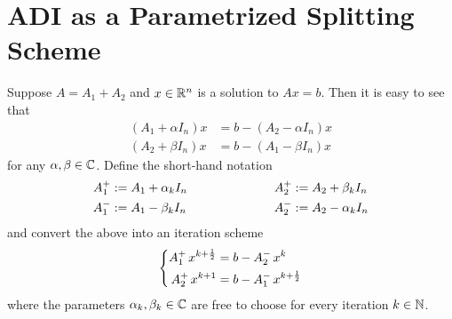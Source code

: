 
\section{ADI as a Parametrized Splitting Scheme}
\label{sec:adi:1step}

Suppose $A=A_1+A_2$ and $x\in\mathbb{R}^n$ is a solution to $Ax=b$.
Then it is easy to see that
\begin{align*}
  (A_1 + \alpha I_n)x &= b - (A_2 - \alpha I_n) x \\
  (A_2 + \beta I_n)x &= b - (A_1 - \beta I_n) x
\end{align*}
for any $\alpha, \beta \in\mathbb{C}$.
Define the short-hand notation
\begin{equation}
\label{eq:adi:shorthand}
\begin{aligned}
  \Aip  &:= A_1 + \alpha_k I_n &
  \qquad\qquad\qquad %
  \Aiip &:= A_2 + \beta_k  I_n \\
  \Aim  &:= A_1 - \beta_k  I_n &
  \Aiim &:= A_2 - \alpha_k I_n
\end{aligned}
\end{equation}
and convert the above into an iteration scheme
\begin{equation}
  \label{eq:adi:general2step}
  \left\{
  \begin{aligned}
    \mathop{A_1^+}  x^{k+\frac{1}{2}} &= b - \mathop{A_2^-} x^k \\
    \mathop{A_2^+} x^{k+1}           &= b - \mathop{A_1^-} x^{k+\frac{1}{2}}
  \end{aligned}
  \right.
\end{equation}
where the parameters $\alpha_k, \beta_k \in\mathbb{C}$ are free to choose for every iteration $k\in\mathbb{N}$.

